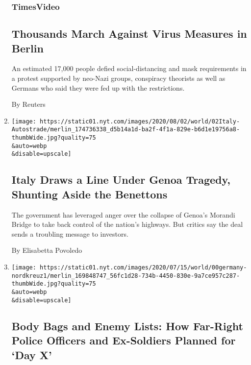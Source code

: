 \begin{enumerate}
  \hypertarget{timesvideo}{%
  \subsubsection{TimesVideo}\label{timesvideo}}

  \hypertarget{thousands-march-against-virus-measures-in-berlin}{%
  \subsection{Thousands March Against Virus Measures in
  Berlin}\label{thousands-march-against-virus-measures-in-berlin}}

  An estimated 17,000 people defied social-distancing and mask
  requirements in a protest supported by neo-Nazi groups, conspiracy
  theorists as well as Germans who said they were fed up with the
  restrictions.

  By Reuters
\item
  \href{/2020/08/01/world/europe/italy-genoa-bridge-collapse-benettons.html}{}

  \texttt{[image: https://static01.nyt.com/images/2020/08/02/world/02Italy-Autostrade/merlin\_174736338\_d5b14a1d-ba2f-4f1a-829e-b6d1e19756a8-thumbWide.jpg?quality=75\\\&auto=webp\\\&disable=upscale]}

  \hypertarget{italy-draws-a-line-under-genoa-tragedy-shunting-aside-the-benettons}{%
  \subsection{Italy Draws a Line Under Genoa Tragedy, Shunting Aside the
  Benettons}\label{italy-draws-a-line-under-genoa-tragedy-shunting-aside-the-benettons}}

  The government has leveraged anger over the collapse of Genoa's
  Morandi Bridge to take back control of the nation's highways. But
  critics say the deal sends a troubling message to investors.

  By Elisabetta Povoledo
\item
  \href{/2020/08/01/world/europe/germany-nazi-infiltration.html}{}

  \texttt{[image: https://static01.nyt.com/images/2020/07/15/world/00germany-nordkreuz1/merlin\_169848747\_56fc1d28-734b-4450-830e-9a7ce957c287-thumbWide.jpg?quality=75\\\&auto=webp\\\&disable=upscale]}

  \hypertarget{body-bags-and-enemy-lists-how-far-right-police-officers-and-ex-soldiers-planned-for-day-x}{%
  \subsection{Body Bags and Enemy Lists: How Far-Right Police Officers
  and Ex-Soldiers Planned for `Day
  X'}\label{body-bags-and-enemy-lists-how-far-right-police-officers-and-ex-soldiers-planned-for-day-x}}


\end{enumerate}
